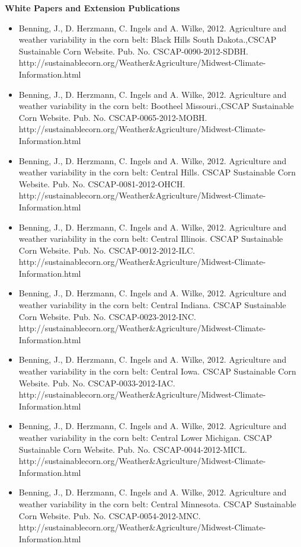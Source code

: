 \normalsize \sf
\normalsize \bf White Papers and Extension Publications
\normalsize \sf
\begin{itemize}
\item Benning, J., D. Herzmann, C. Ingels and A. Wilke, 2012. Agriculture and weather variability in the corn belt: Black Hills South Dakota.,CSCAP Sustainable Corn Website. Pub. No. CSCAP-0090-2012-SDBH. http://sustainablecorn.org/Weather\&Agriculture/Midwest-Climate-Information.html
\item Benning, J., D. Herzmann, C. Ingels and A. Wilke, 2012. Agriculture and weather variability in the corn belt: Bootheel Missouri.,CSCAP Sustainable Corn Website. Pub. No. CSCAP-0065-2012-MOBH. http://sustainablecorn.org/Weather\&Agriculture/Midwest-Climate-Information.html
\item Benning, J., D. Herzmann, C. Ingels and A. Wilke, 2012. Agriculture and weather variability in the corn belt: Central Hills. CSCAP Sustainable Corn Website. Pub. No. CSCAP-0081-2012-OHCH. http://sustainablecorn.org/Weather\&Agriculture/Midwest-Climate-Information.html
\item Benning, J., D. Herzmann, C. Ingels and A. Wilke, 2012. Agriculture and weather variability in the corn belt: Central Illinois. CSCAP Sustainable Corn Website. Pub. No. CSCAP-0012-2012-ILC. http://sustainablecorn.org/Weather\&Agriculture/Midwest-Climate-Information.html
\item Benning, J., D. Herzmann, C. Ingels and A. Wilke, 2012. Agriculture and weather variability in the corn belt: Central Indiana. CSCAP Sustainable Corn Website. Pub. No. CSCAP-0023-2012-INC. http://sustainablecorn.org/Weather\&Agriculture/Midwest-Climate-Information.html
\item Benning, J., D. Herzmann, C. Ingels and A. Wilke, 2012. Agriculture and weather variability in the corn belt: Central Iowa. CSCAP Sustainable Corn Website. Pub. No. CSCAP-0033-2012-IAC. http://sustainablecorn.org/Weather\&Agriculture/Midwest-Climate-Information.html
\item Benning, J., D. Herzmann, C. Ingels and A. Wilke, 2012. Agriculture and weather variability in the corn belt: Central Lower Michigan. CSCAP Sustainable Corn Website. Pub. No. CSCAP-0044-2012-MICL. http://sustainablecorn.org/Weather\&Agriculture/Midwest-Climate-Information.html
\item Benning, J., D. Herzmann, C. Ingels and A. Wilke, 2012. Agriculture and weather variability in the corn belt: Central Minnesota. CSCAP Sustainable Corn Website. Pub. No. CSCAP-0054-2012-MNC. http://sustainablecorn.org/Weather\&Agriculture/Midwest-Climate-Information.html

\end{itemize}
